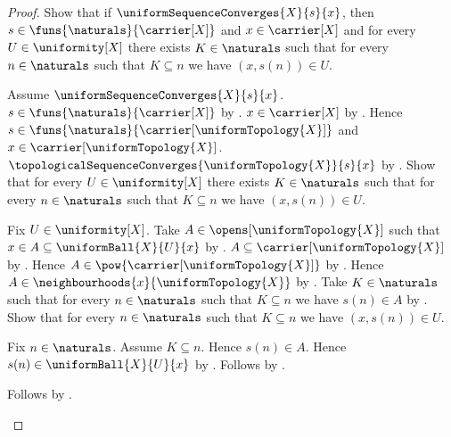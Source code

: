 \begin{proof}
    Show that if $\uniformSequenceConverges{X}{s}{x}$, then
        $s\in\funs{\naturals}{\carrier[X]}$ and $x\in\carrier[X]$ and for
            every $U\in\uniformity[X]$ there exists $K\in\naturals$ such
            that for every $n\in\naturals$ such that $K\subseteq n$ we have
            $(x,s(n))\in U$.
    \begin{subproof}
        Assume $\uniformSequenceConverges{X}{s}{x}$.
        $s\in\funs{\naturals}{\carrier[X]}$ by
            .
        $x\in\carrier[X]$ by .
        Hence $s\in\funs{\naturals}{\carrier[\uniformTopology{X}]}$ and
            $x\in\carrier[\uniformTopology{X}]$.
        $\topologicalSequenceConverges{\uniformTopology{X}}{s}{x}$
            by .
        Show that for every $U\in\uniformity[X]$ there exists
            $K\in\naturals$ such that for every $n\in\naturals$
            such that $K\subseteq n$ we have $(x,s(n))\in U$.
        \begin{subproof}
            Fix $U\in\uniformity[X]$.
            Take $A\in\opens[\uniformTopology{X}]$ such that
                $x\in A\subseteq\uniformBall{X}{U}{x}$
                by .
            $A\subseteq\carrier[\uniformTopology{X}]$
                by .
            Hence $A\in\pow{\carrier[\uniformTopology{X}]}$
                by .
            Hence $A\in\neighbourhoods{x}{\uniformTopology{X}}$
                by .
            Take $K\in\naturals$ such that for every $n\in\naturals$
                such that $K\subseteq n$ we have $s(n)\in A$
                by
                .
            Show that for every $n\in\naturals$ such that $K\subseteq n$
                we have $(x,s(n))\in U$.
            \begin{subproof}
                Fix $n\in\naturals$.
                Assume $K\subseteq n$.
                Hence $s(n)\in A$.
                Hence $s(n)\in\uniformBall{X}{U}{x}$ by .
                Follows by .
            \end{subproof}
            Follows by \auto.
        \end{subproof}
    \end{subproof}


\end{proof}
